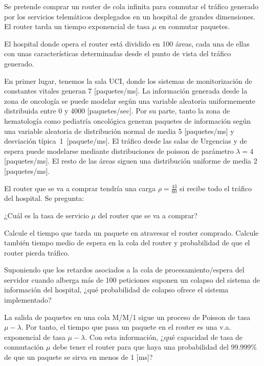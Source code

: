 \documentclass{upmassignment}
\date{\today}
\begin{document}
Se pretende comprar un router de cola infinita
para conmutar el tráfico generado por los servicios telemáticos desplegados en un hospital de grandes dimensiones.
El router tarda un tiempo exponencial de tasa
$\mu$ en conmutar paquetes.

El hospital donde opera el router está dividido en 100 áreas, cada una de ellas con unas características determinadas desde el punto de vista del tráfico generado.

En primer lugar, tenemos la sala UCI, donde los sistemas de monitorización de constantes vitales generan 7 [paquetes/ms]. La información generada desde la zona de oncología se puede modelar según una variable aleatoria uniformemente distribuida entre 0 y 4000 [paquetes/sec]. Por su parte, tanto la zona de hematología como pediatría oncológica generan paquetes de información según una variable aleatoria de distribución normal de media 5 [paquetes/ms] y desviación típica~1~[paquete/ms]. El tráfico desde las salas de Urgencias y de espera puede modelarse mediante distribuciones de poisson de parámetro $\lambda=4$ [paquetes/ms]. El resto de las áreas siguen una distribución uniforme de media 2 [paquetes/ms]. 

El router que se va a comprar tendría una
carga $\rho=\tfrac{43}{60}$ si recibe todo
el tráfico del hospital. Se pregunta:

\begin{problemlist}
    \pbitem ¿Cuál es la tasa de servicio $\mu$
    del router que se va a comprar?

    \begin{solucion}
        
    \end{solucion}

    \pbitem Calcule el tiempo que tarda
    un paquete en atravesar el router comprado.
    Calcule también tiempo medio de espera
    en la cola del router
    y probabilidad de que el router pierda
    tráfico.


    \begin{solucion}
        
    \end{solucion}

    \pbitem Suponiendo que los retardos asociados a la cola de procesamiento/espera del servidor cuando alberga más de 100 peticiones suponen un colapso del sistema de información del hospital, ¿qué probabilidad de colapso ofrece el sistema implementado?

    \begin{solucion}
        
    \end{solucion}


    \pbitem La salida de paquetes en una cola
    M/M/1 sigue un proceso de Poisson de tasa
    $\mu-\lambda$. Por tanto, el tiempo que
    pasa un paquete en el router es una v.a. exponencial de tasa $\mu-\lambda$. Con esta información, ¿qué capacidad de tasa de conmutación
    $\mu$ debe tener el router para que haya una probabilidad del 99.999\% de que un paquete se sirva en menos de 1 [ms]?

    \begin{solucion}
        
    \end{solucion}
\end{problemlist}
\end{document}
